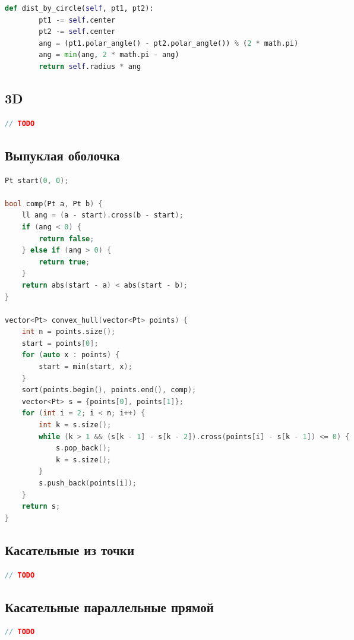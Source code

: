 \documentclass[10pt,a4paper,landscape,twosided]{extarticle}
\begin{document}
\begin{multicols*}{3}
\begin{lstlisting}[language=Python]
    def dist_by_circle(self, pt1, pt2):
        pt1 -= self.center
        pt2 -= self.center
        ang = (pt1.polar_angle() - pt2.polar_angle()) % (2 * math.pi)
        ang = min(ang, 2 * math.pi - ang)
        return self.radius * ang


\end{lstlisting}

\subsection{3D}
\begin{lstlisting}[language=C++]
// TODO

\end{lstlisting}

\subsection{Выпуклая оболочка}
\begin{lstlisting}[language=C++]
Pt start(0, 0);

bool comp(Pt a, Pt b) {
    ll ang = (a - start).cross(b - start);
    if (ang < 0) {
        return false;
    } else if (ang > 0) {
        return true;
    }
    return abs(start - a) < abs(start - b);
}

vector<Pt> convex_hull(vector<Pt> points) {
    int n = points.size();
    start = points[0];
    for (auto x : points) {
        start = min(start, x);
    }
    sort(points.begin(), points.end(), comp);
    vector<Pt> s = {points[0], points[1]};
    for (int i = 2; i < n; i++) {
        int k = s.size();
        while (k > 1 && (s[k - 1] - s[k - 2]).cross(points[i] - s[k - 1]) <= 0) {
            s.pop_back();
            k = s.size();
        }
        s.push_back(points[i]);
    }
    return s;
}


\end{lstlisting}

\subsection{Касательные из точки}
\begin{lstlisting}[language=C++]
// TODO

\end{lstlisting}

\subsection{Касательные параллельные прямой}
\begin{lstlisting}[language=C++]
// TODO


\end{lstlisting}
\end{multicols*}
\end{document}
